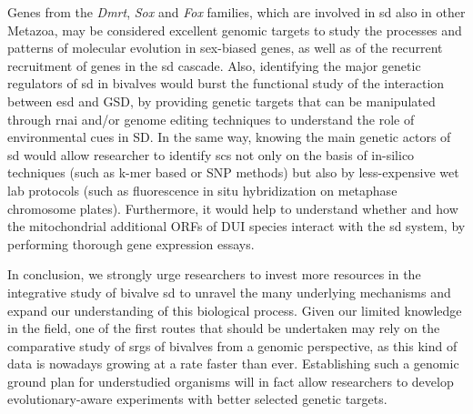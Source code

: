 \documentclass[../main.tex]{subfiles}
\begin{document}
Genes from the \textit{Dmrt}, \textit{Sox} and \textit{Fox} families, which are involved in \gls{sd} also in other Metazoa, may be considered excellent genomic targets to study the processes and patterns of molecular evolution in sex-biased genes, as well as of the recurrent recruitment of genes in the \gls{sd} cascade. Also, identifying the major genetic regulators of \gls{sd} in bivalves would burst the functional study of the interaction between \gls{esd} and GSD, by providing genetic targets that can be manipulated through \gls{rnai} and/or genome editing techniques to understand the role of environmental cues in SD. In the same way, knowing the main genetic actors of \gls{sd} would allow researcher to identify \glspl{sc} not only on the basis of in-silico techniques (such as k-mer based or SNP methods) but also by less-expensive wet lab protocols (such as fluorescence in situ hybridization on metaphase chromosome plates). Furthermore, it would help to understand whether and how the mitochondrial additional ORFs of DUI species interact with the \gls{sd} system, by performing thorough gene expression essays.

In conclusion, we strongly urge researchers to invest more resources in the integrative study of bivalve \gls{sd} to unravel the many underlying mechanisms and expand our understanding of this biological process. Given our limited knowledge in the field, one of the first routes that should be undertaken may rely on the comparative study of \glspl{srg} of bivalves from a genomic perspective, as this kind of data is nowadays growing at a rate faster than ever. Establishing such a genomic ground plan for understudied organisms will in fact allow researchers to develop evolutionary-aware experiments with better selected genetic targets.
\end{document}
